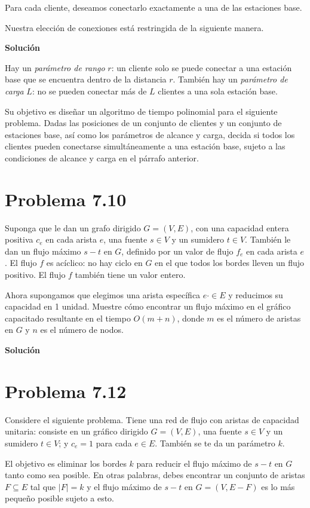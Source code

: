 \documentclass{article}
\begin{document}
Para cada cliente, deseamos conectarlo exactamente a una de las estaciones base.

Nuestra elección de conexiones está restringida de la siguiente manera.

\textbf{Solución}

Hay un \textit{parámetro de rango} $r$: un cliente solo se puede conectar a una
estación base que se encuentra dentro de la distancia $r$. También hay un
\textit{parámetro de carga} $L$: no se pueden conectar más de $L$ clientes a una
sola estación base.

Su objetivo es diseñar un algoritmo de tiempo polinomial para el siguiente
problema. Dadas las posiciones de un conjunto de clientes y un conjunto de
estaciones base, así como los parámetros de alcance y carga, decida si todos los
clientes pueden conectarse simultáneamente a una estación base, sujeto a las
condiciones de alcance y carga en el párrafo anterior.

\section*{Problema 7.10}

Suponga que le dan un grafo dirigido $G = (V , E)$, con una capacidad entera
positiva $c_e$ en cada arista $e$, una fuente $s \in V$ y un sumidero $t \in V$.
También le dan un flujo máximo $s-t$ en $G$, definido por un valor de flujo
$f_e$ en cada arista $e$. El flujo $f$ es acíclico: no hay ciclo en $G$ en el
que todos los bordes lleven un flujo positivo. El flujo $f$ también tiene un
valor entero.

Ahora supongamos que elegimos una arista específica $e \cdot \in E$ y reducimos su
capacidad en 1 unidad. Muestre cómo encontrar un flujo máximo en el gráfico
capacitado resultante en el tiempo $O(m + n)$, donde $m$ es el número de aristas en
$G$ y $n$ es el número de nodos.

\textbf{Solución}

\section*{Problema 7.12}

Considere el siguiente problema. Tiene una red de flujo con aristas de capacidad
unitaria: consiste en un gráfico dirigido $G = (V , E)$, una fuente $s \in V$ y
un sumidero $t \in V$; y $c_e = 1$ para cada $e \in E$. También se te da un
parámetro $k$.

El objetivo es eliminar los bordes $k$ para reducir el flujo máximo de $s-t$ en
$G$ tanto como sea posible. En otras palabras, debes encontrar un conjunto de
aristas $F \subseteq E$ tal que $|F| = k$ y el flujo máximo de $s-t$ en $G = (V
, E - F)$ es lo más pequeño posible sujeto a esto.
\end{document}
